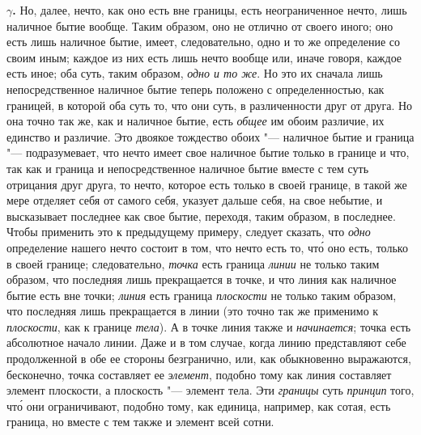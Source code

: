 {\bfseries $\gamma $.} Но, далее, нечто, как оно есть вне границы, есть
неограниченное нечто, лишь наличное бытие вообще. Таким образом, оно не
отлично от своего иного; оно есть лишь наличное бытие, имеет,
следовательно, одно и то же определение со своим иным; каждое из них есть
лишь нечто вообще или, иначе говоря, каждое есть иное; оба суть, таким
образом, {\em одно и то же}. Но это их сначала лишь
непосредственное наличное бытие теперь положено с определенностью, как
границей, в которой оба суть то, что они суть, в различенности друг от
друга. Но она точно так же, как и наличное бытие, есть
{\em общее} им обоим различие, их единство и различие.
Это двоякое тождество обоих "--- наличное бытие и граница "--- подразумевает, что
нечто имеет свое наличное бытие только в границе и что, так как и граница и
непосредственное наличное бытие вместе с тем суть отрицания друг друга, то
нечто, которое есть только в своей границе, в такой же мере отделяет себя
от самого себя, указует дальше себя, на свое небытие, и высказывает
последнее как свое бытие, переходя, таким образом, в последнее. Чтобы
применить это к предыдущему примеру, следует сказать, что
{\em одно} определение нашего нечто состоит в том, что
нечто есть то, чт\'{о} оно есть, только в своей границе; следовательно,
{\em точка} есть граница
{\em линии} не только таким образом, что последняя лишь
прекращается в точке, и что линия как наличное бытие есть вне точки;
{\em линия} есть граница
{\em плоскости} не только таким образом, что последняя
лишь прекращается в линии (это точно так же применимо к
{\em плоскости}, как к границе
{\em тела}). А в точке линия также и
{\em начинается}; точка есть абсолютное начало линии.
Даже и в том случае, когда линию представляют себе продолженной в обе ее
стороны безгранично, или, как обыкновенно выражаются, бесконечно, точка
составляет ее {\em элемент}, подобно тому как линия
составляет элемент плоскости, а плоскость "--- элемент тела. Эти
{\em границы} суть {\em принцип}
того, чт\'{о} они ограничивают, подобно тому, как единица, например, как сотая,
есть граница, но вместе с тем также и элемент всей сотни.


